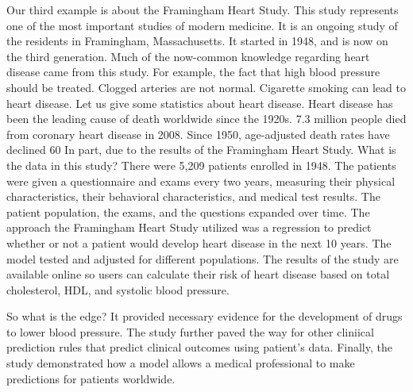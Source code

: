 
Our third example is about the Framingham Heart Study.
This study represents one of the most important studies
of modern medicine.
It is an ongoing study of the residents
in Framingham, Massachusetts.
It started in 1948, and is now on the third generation.
Much of the now-common knowledge regarding heart disease
came from this study.
For example, the fact that high blood pressure
should be treated.
Clogged arteries are not normal.
Cigarette smoking can lead to heart disease.
Let us give some statistics about heart disease.
Heart disease has been the leading cause of death
worldwide since the 1920s.
7.3 million people died from coronary heart disease in 2008.
Since 1950, age-adjusted death rates have declined 60%
In part, due to the results of the Framingham Heart Study.
What is the data in this study?
There were 5,209 patients enrolled in 1948.
The patients were given a questionnaire and exams
every two years, measuring their physical characteristics,
their behavioral characteristics,
and medical test results.
The patient population, the exams, and the questions
expanded over time.
The approach the Framingham Heart Study utilized
was a regression to predict whether or not
a patient would develop heart disease in the next 10 years.
The model tested and adjusted for different populations.
The results of the study are available online
so users can calculate their risk of heart disease
based on total cholesterol, HDL, and systolic blood pressure.

So what is the edge?
It provided necessary evidence for the development of drugs
to lower blood pressure.
The study further paved the way for other cliniical prediction
rules that predict clinical outcomes using patient's data.
Finally, the study demonstrated how
a model allows a medical professional
to make predictions for patients worldwide.